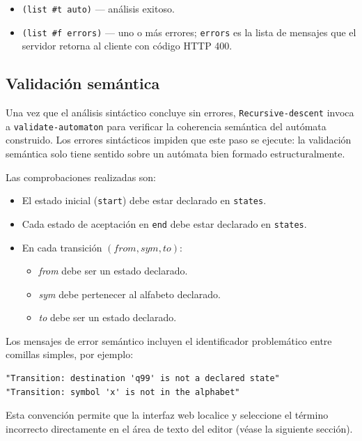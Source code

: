 \documentclass{article}
\begin{document}
\begin{itemize}
  \item \texttt{(list \#t auto)} — análisis exitoso.
  \item \texttt{(list \#f errors)} — uno o más errores; \texttt{errors} es la lista
        de mensajes que el servidor retorna al cliente con código HTTP 400.
\end{itemize}

\subsection{Validación semántica}

Una vez que el análisis sintáctico concluye sin errores, \texttt{Recursive-descent}
invoca a \texttt{validate-automaton} para verificar la coherencia semántica del
autómata construido.
Los errores sintácticos impiden que este paso se ejecute: la validación semántica
solo tiene sentido sobre un autómata bien formado estructuralmente.

Las comprobaciones realizadas son:

\begin{itemize}
  \item El estado inicial (\texttt{start}) debe estar declarado en \texttt{states}.
  \item Cada estado de aceptación en \texttt{end} debe estar declarado en
        \texttt{states}.
  \item En cada transición $(\mathit{from}, \mathit{sym}, \mathit{to})$:
    \begin{itemize}
      \item \textit{from} debe ser un estado declarado.
      \item \textit{sym} debe pertenecer al alfabeto declarado.
      \item \textit{to} debe ser un estado declarado.
    \end{itemize}
\end{itemize}

Los mensajes de error semántico incluyen el identificador problemático entre
comillas simples, por ejemplo:

\begin{verbatim}
"Transition: destination 'q99' is not a declared state"
"Transition: symbol 'x' is not in the alphabet"
\end{verbatim}

Esta convención permite que la interfaz web localice y seleccione el término
incorrecto directamente en el área de texto del editor (véase la siguiente sección).
\end{document}
